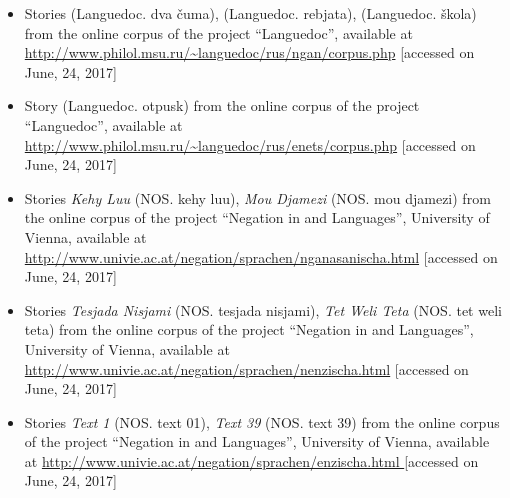 \documentclass[output=paper]{LSP/langsci}
\begin{document}
\begin{itemize}
\item Stories \textit{} (Languedoc. dva čuma), \textit{} (Languedoc. rebjata), \textit{} (Languedoc. škola) from the online corpus of the project “Languedoc”, available at \url{http://www.philol.msu.ru/~languedoc/rus/ngan/corpus.php} [accessed on June, 24, 2017]

\item Story \textit{} (Languedoc. otpusk) from the online corpus of the project “Languedoc”, available at 
\url{http://www.philol.msu.ru/~languedoc/rus/enets/corpus.php} [accessed on June, 24, 2017]

\item Stories \textit{Kehy Luu} (NOS. kehy luu), \textit{Mou Djamezi} (NOS. mou djamezi) from the online corpus of the project “Negation in  and  Languages”, University of Vienna, available at\\ \url{http://www.univie.ac.at/negation/sprachen/nganasanischa.html} [accessed on June, 24, 2017]

\item Stories \textit{Tesjada Nisjami} (NOS. tesjada nisjami), \textit{Tet Weli Teta} (NOS. tet weli teta) from the online corpus of the project “Negation in  and  Languages”, University of Vienna, available at\\
\url{http://www.univie.ac.at/negation/sprachen/nenzischa.html} [accessed on June, 24, 2017]

\item Stories \textit{Text 1} (NOS. text 01), \textit{Text 39} (NOS. text 39) from the online corpus of the project “Negation in  and  Languages”, University of Vienna, available at \url{http://www.univie.ac.at/negation/sprachen/enzischa.html }  [accessed on June, 24, 2017]


\end{itemize}
\newpage 
{\sloppy
\printbibliography[heading=subbibliography,notkeyword=this] }
\end{document}

